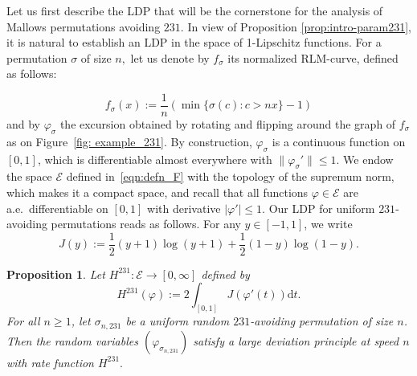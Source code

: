 \documentclass[a4paper,11pt]{amsart}
\newtheorem{prop}[thm]{Proposition}
\theoremstyle{definition}
\begin{document}
Let us first describe the LDP that will be the cornerstone for the analysis of Mallows permutations avoiding $231.$ In view of Proposition \ref{prop:intro-param231}, it is natural to establish an LDP in the space of 1-Lipschitz functions. For a permutation $\sigma$ of size $n,$ let us denote by
$f_\sigma$ its normalized RLM-curve, defined as follows:

\[ f_\sigma(x) := \frac 1 n \left( \min\{\sigma(c) : c>nx\}-1\right)\]
and by $\varphi_\sigma$ the excursion obtained by rotating and flipping around the graph of $f_\sigma$ as on Figure~\ref{fig: example_231}.
By construction, $\varphi_\sigma$ is a continuous function on $[0,1]$, which is differentiable almost everywhere
with $\|\varphi_\sigma'\|\le 1.$ 
We endow the space $\mathcal E$ defined in~\eqref{eqn:defn_F} with the topology of the supremum norm, which makes it a compact space, and recall that all functions $\varphi\in\mathcal{E}$ are a.e.~differentiable on $[0,1]$ with derivative $|\varphi'| \le 1$.
Our LDP for uniform $231$-avoiding permutations reads as follows. 
For any $y \in [-1,1]$, we write
\begin{equation}\label{eqn:defn_J}
	J(y) := \frac12 (y+1)\log(y+1) + \frac12 (1-y)\log(1-y).
\end{equation}
\begin{prop}\label{prop:LDP_231_pi_intro}
  Let $H^{231}: \mathcal E \rightarrow [0,\infty]$ defined by
           \[H^{231}(\varphi) := 2 \int_{[0,1]} J(\varphi'(t)) \mathrm dt.\]
	For all $n \geq 1$, let $\sigma_{n,231}$ be a uniform random $231$-avoiding permutation of size $n$.
    Then the random variables $(\varphi_{\sigma_{n,231}})$ satisfy a large deviation principle at speed $n$ with rate function $H^{231}.$
\end{prop}
\end{document}
